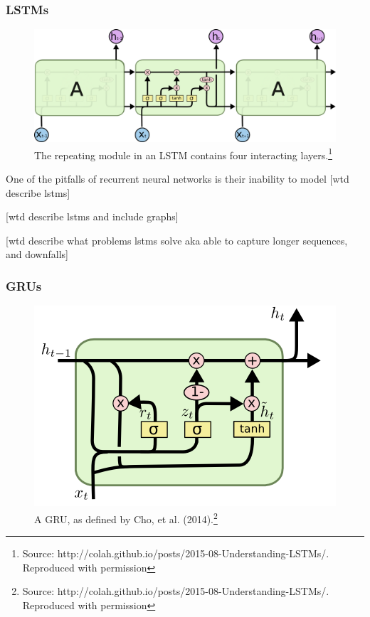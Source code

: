 \documentclass[a4paper,11pt,twoside]{scrbook}
\begin{document}
\subsubsection{LSTMs}

\begin{figure}[h]
    \centering
	\includegraphics[width=.8\textwidth]{./images/illustrations/LSTM3}
    \caption{The repeating module in an LSTM contains four interacting layers.\footnote{Source: http://colah.github.io/posts/2015-08-Understanding-LSTMs/. Reproduced with permission}}
    \label{fig:mesh1}
\end{figure}

	



One of the pitfalls of recurrent neural networks is their inability to model [wtd describe lstms]

[wtd describe lstms and include graphs]

[wtd describe what problems lstms solve aka able to capture longer sequences, and downfalls]

\subsubsection{GRUs}

\begin{figure}[h]
    \centering
	\includegraphics[width=.8\textwidth]{./images/illustrations/GRU}
    \caption{A GRU, as defined by Cho, et al. (2014).\footnote{Source: http://colah.github.io/posts/2015-08-Understanding-LSTMs/. Reproduced with permission}}
    \label{fig:mesh1}
\end{figure}
\end{document}
